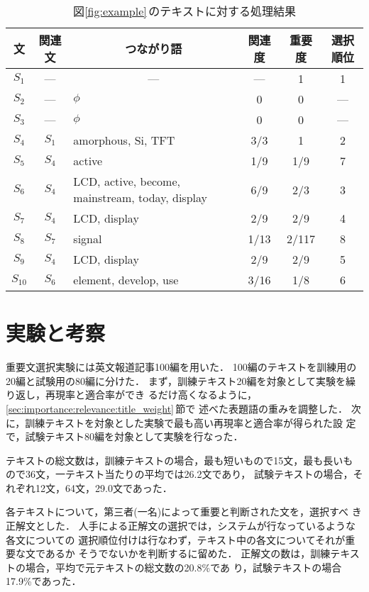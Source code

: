 \begin{table}[htbp]
\caption{図\protect\ref{fig:example}\,のテキストに対する処理結果}
\label{tab:example_result}
\begin{center}
\small{
\begin{tabular}{|c||c|l|c|c|c|}\hline
文&関連文&\multicolumn{1}{|c|}{つながり語}&関連度&重要度&選択順位
\\\hline\hline 
$S_1$   &---  &\multicolumn{1}{|c|}{---}&---&1&1\\
$S_2$   &---  &$\phi$&0&0&---\\
$S_3$   &---  &$\phi$&0&0&---\\
$S_4$   &$S_1$&amorphous, Si, TFT&3/3&1&2\\
$S_5$   &$S_4$&active&1/9&1/9&7\\
$S_6$   &$S_4$&LCD, active, become, mainstream, today, display&6/9&2/3&3\\
$S_7$   &$S_4$&LCD, display&2/9&2/9&4\\
$S_8$   &$S_7$&signal&1/13&2/117&8\\
$S_9$   &$S_4$&LCD, display&2/9&2/9&5\\
$S_{10}$&$S_6$&element, develop, use&3/16&1/8&6\\\hline
\end{tabular}
}
\end{center}
\end{table}

\section{実験と考察}
\label{sec:experiment}

重要文選択実験には英文報道記事100編を用いた．
100編のテキストを訓練用の20編と試験用の80編に分けた．
まず，訓練テキスト20編を対象として実験を繰り返し，再現率と適合率ができ
るだけ高くなるように，\ref{sec:importance:relevance:title_weight}\,節で
述べた表題語の重みを調整した．
次に，訓練テキストを対象とした実験で最も高い再現率と適合率が得られた設
定で，試験テキスト80編を対象として実験を行なった．

テキストの総文数は，訓練テキストの場合，最も短いもので15文，最も長いも
ので36文，一テキスト当たりの平均では26.2文であり，
試験テキストの場合，それぞれ12文，64文，29.0文であった．

各テキストについて，第三者(一名)によって重要と判断された文を，選択すべ
き正解文とした．
人手による正解文の選択では，システムが行なっているような各文についての
選択順位付けは行なわず，テキスト中の各文についてそれが重要な文であるか
そうでないかを判断するに留めた．
正解文の数は，訓練テキストの場合，平均で元テキストの総文数の20.8\%であ
り，試験テキストの場合17.9\%であった．


